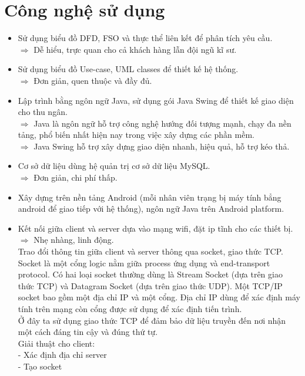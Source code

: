\documentclass[a4paper,12pt]{report}
\begin{document}
\section{Công nghệ sử dụng}
\begin{itemize}
	\item Sử dụng biểu đồ DFD, FSO và thực thể liên kết để phân tích yêu cầu.
	\\$\Rightarrow$ Dễ hiểu, trực quan cho cả khách hàng lẫn đội ngũ kĩ sư.
	\item Sử dụng biểu đồ Use-case, UML classes để thiết kế hệ thống.
	\\$\Rightarrow$ Đơn giản, quen thuộc và đầy đủ.
	\item Lập trình bằng ngôn ngữ Java, sử dụng gói Java Swing để thiết kế giao diện cho thu ngân.
	\\$\Rightarrow$ Java là ngôn ngữ hỗ trợ công nghệ hướng đối tượng mạnh, chạy đa nền tảng, phổ biến nhất hiện nay trong việc xây dựng các phần mềm.
	\\$\Rightarrow$ Java Swing hỗ trợ xây dựng giao diện nhanh, hiệu quả, hỗ trợ kéo thả.
	\item Cơ sở dữ liệu dùng hệ quản trị cơ sở dữ liệu MySQL.
	\\$\Rightarrow$ Đơn giản, chi phí thấp.
	\item Xây dựng trên nền tảng Android (mỗi nhân viên trạng bị máy tính bẳng android để giao tiếp với hệ thống), ngôn ngữ Java trên Android platform.
	\item Kết nối giữa client và server dựa vào mạng wifi, đặt ip tĩnh cho các thiết bị.
	\\$\Rightarrow$ Nhẹ nhàng, linh động.
	\\ Trao đổi thông tin giữa client và server thông qua socket, giao thức TCP.
	\\ Socket là một cổng logic nằm giữa process ứng dụng và end-transport protocol. Có hai loại socket thường dùng là Stream Socket (dựa trên giao thức TCP) và Datagram Socket (dựa trên giao thức UDP). Một TCP/IP socket bao gồm một địa chỉ IP và một cổng. Địa chỉ IP dùng để xác định máy tính trên mạng còn cổng được sử dụng để xác định tiến trình.
	\\ Ở đây ta sử dụng giao thức TCP để đảm bảo dữ liệu truyền đến nơi nhận một cách đáng tin cậy và đúng thứ tự.
	\\ Giải thuật cho client:
	\\ \hspace*{3mm} - Xác định địa chỉ server
	\\ \hspace*{3mm} - Tạo socket

\end{itemize}
\end{document}
